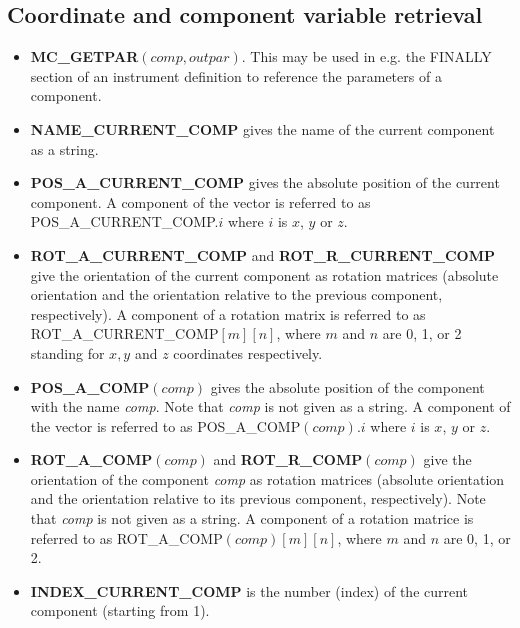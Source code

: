 \subsection{Coordinate and component variable retrieval}
\begin{itemize}
\item {\bfseries MC\_GETPAR}$(comp, outpar)$. This may be used in e.g. the FINALLY section of an
  instrument definition to reference the parameters of a
  component.
\item {\bfseries NAME\_CURRENT\_COMP} gives the name of the current component as a string.
\item {\bfseries POS\_A\_CURRENT\_COMP} gives the absolute position of the
  current component. A component of the vector is referred to as
  POS\_A\_CURRENT\_COMP.$i$ where $i$ is $x$, $y$ or $z$.
\item {\bfseries ROT\_A\_CURRENT\_COMP} and
  {\bfseries ROT\_R\_CURRENT\_COMP} give the orientation
  of the current component as rotation matrices
  (absolute orientation and the orientation relative to
  the previous component, respectively). A
  component of a rotation matrix is referred to as
  ROT\_A\_CURRENT\_COMP$[m][n]$, where $m$ and
  $n$ are 0, 1, or 2 standing for $x,y$ and $z$ coordinates respectively.
\item {\bfseries POS\_A\_COMP}$(comp)$ gives the absolute position
  of the component with the name {\em comp}. Note that
  {\em comp} is not given as a string. A component of the
  vector is referred to as POS\_A\_COMP$(comp).i$
  where $i$ is $x$, $y$ or $z$.
\item {\bfseries ROT\_A\_COMP}$(comp)$ and
  {\bfseries ROT\_R\_COMP}$(comp)$ give the orientation of the
  component {\em comp} as rotation matrices (absolute
  orientation and the orientation relative to its
  previous component, respectively). Note that {\em comp}
  is not given as a string. A component of  a rotation
  matrice is referred to as
  ROT\_A\_COMP$(comp)[m][n]$, where $m$ and $n$ are
  0, 1, or 2.
\item {\bfseries INDEX\_CURRENT\_COMP} is the number (index) of the
       current component  (starting from 1).

\end{itemize}
